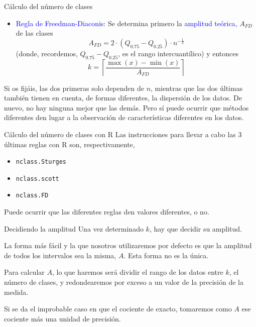 \documentclass[
  ignorenonframetext,
  aspectratio=169]{beamer}
\providecommand{\tightlist}{%
  \setlength{\itemsep}{0pt}\setlength{\parskip}{0pt}}
\newcommand\blue[1]{\textcolor{blue}{#1}}
\begin{document}
\begin{frame}{Cálculo del número de clases}
\protect\hypertarget{cuxe1lculo-del-nuxfamero-de-clases-2}{}
\begin{itemize}
\tightlist
\item
  \blue{Regla de Freedman-Diaconis}: Se determina primero la
  \blue{amplitud teórica}, \(A_{FD}\) de las clases
  \[A_{FD} = 2\cdot(Q_{0.75}-Q_{0.25})\cdot n^{-\frac{1}{3}}\] (donde,
  recordemos, \(Q_{0.75}-Q_{0.25}\), es el rango intercuantílico) y
  entonces
  \[k = \left\lceil \frac{\max(x)-\min(x)}{A_{FD}}\right\rceil\]
\end{itemize}

Si os fijáis, las dos primeras solo dependen de \(n\), mientras que las
dos últimas también tienen en cuenta, de formas diferentes, la
dispersión de los datos. De nuevo, no hay ninguna mejor que las demás.
Pero sí puede ocurrir que métodos diferentes den lugar a la observación
de características diferentes en los datos.
\end{frame}

\begin{frame}[fragile]{Cálculo del número de clases con R}
\protect\hypertarget{cuxe1lculo-del-nuxfamero-de-clases-con-r}{}
Las instrucciones para llevar a cabo las 3 últimas reglas con R son,
respectivamente,

\begin{itemize}
\tightlist
\item
  \texttt{nclass.Sturges}
\item
  \texttt{nclass.scott}
\item
  \texttt{nclass.FD}
\end{itemize}

Puede ocurrir que las diferentes reglas den valores diferentes, o no.
\end{frame}

\begin{frame}{Decidiendo la amplitud}
\protect\hypertarget{decidiendo-la-amplitud}{}
Una vez determinado \(k\), hay que decidir su amplitud.

La forma más fácil y la que nosotros utilizaremos por defecto es que la
amplitud de todos los intervalos sea la misma, \(A\). Esta forma no es
la única.

Para calcular \(A\), lo que haremos será dividir el rango de los datos
entre \(k\), el número de clases, y redondearemos por exceso a un valor
de la precisión de la medida.

Si se da el improbable caso en que el cociente de exacto, tomaremos como
\(A\) ese cociente más una unidad de precisión.
\end{frame}
\end{document}
